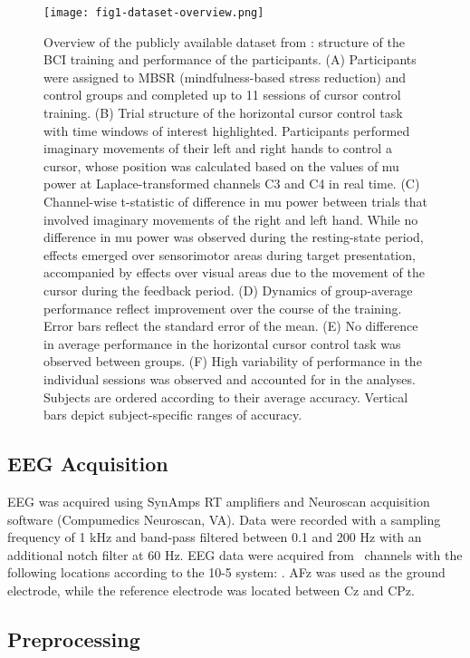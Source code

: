 \begin{figure}[htbp]
    \centering
    \texttt{[image: fig1-dataset-overview.png]}
    \caption{Overview of the publicly available dataset from \citep{Stieger2021_dataset}: structure of the BCI training and performance of the participants. (A) Participants were assigned to MBSR (mindfulness-based stress reduction) and control groups and completed up to 11 sessions of cursor control training. (B) Trial structure of the horizontal cursor control task with time windows of interest highlighted. Participants performed imaginary movements of their left and right hands to control a cursor, whose position was calculated based on the values of mu power at Laplace-transformed channels C3 and C4 in real time. (C) Channel-wise t-statistic of difference in mu power between trials that involved imaginary movements of the right and left hand. While no difference in mu power was observed during the resting-state period, effects emerged over sensorimotor areas during target presentation, accompanied by effects over visual areas due to the movement of the cursor during the feedback period. (D) Dynamics of group-average performance reflect improvement over the course of the training. Error bars reflect the standard error of the mean. (E) No difference in average performance in the horizontal cursor control task was observed between groups. (F) High variability of performance in the individual sessions was observed and accounted for in the analyses. Subjects are ordered according to their average accuracy. Vertical bars depict subject-specific ranges of accuracy.}
    \label{fig:dataset_overview}
\end{figure}

\subsection{EEG Acquisition}

EEG was acquired using SynAmps RT amplifiers and Neuroscan acquisition software (Compumedics Neuroscan, VA). Data were recorded with a sampling frequency of 1 kHz and band-pass filtered between 0.1 and 200 Hz with an additional notch filter at 60 Hz. EEG data were acquired from \numChannelsOrig~channels with the following locations according to the 10-5 system: \channelsOrig. AFz was used as the ground electrode, while the reference electrode was located between Cz and CPz.

\subsection{Preprocessing}

